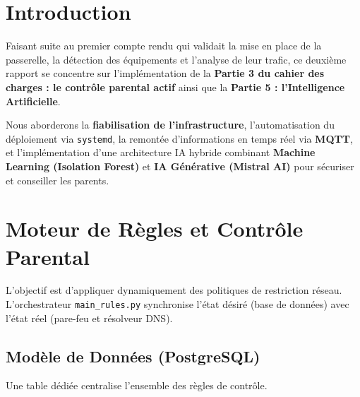 \documentclass[11pt,a4paper]{article}
\begin{document}
\tableofcontents
\thispagestyle{empty}
\newpage

\section*{Introduction}

Faisant suite au premier compte rendu qui validait la mise en place de la passerelle, la détection des équipements et l'analyse de leur trafic, ce deuxième rapport se concentre sur l'implémentation de la \textbf{Partie 3 du cahier des charges : le contrôle parental actif} ainsi que la \textbf{Partie 5 : l'Intelligence Artificielle}. 

Nous aborderons la \textbf{fiabilisation de l'infrastructure}, l'automatisation du déploiement via \texttt{systemd}, la remontée d'informations en temps réel via \textbf{MQTT}, et l'implémentation d'une architecture IA hybride combinant \textbf{Machine Learning (Isolation Forest)} et \textbf{IA Générative (Mistral AI)} pour sécuriser et conseiller les parents.

\section{Moteur de Règles et Contrôle Parental}

L'objectif est d'appliquer dynamiquement des politiques de restriction réseau. L'orchestrateur \texttt{main\_rules.py} synchronise l'état désiré (base de données) avec l'état réel (pare-feu et résolveur DNS).

\subsection{Modèle de Données (PostgreSQL)}
Une table dédiée centralise l'ensemble des règles de contrôle.
\end{document}
